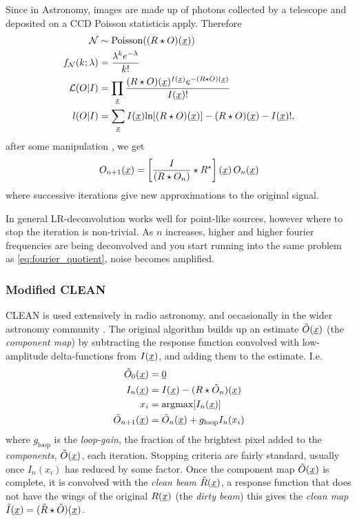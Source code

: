 Since in Astronomy, images are made up of photons collected by a telescope and deposited on a CCD Poisson statisticis apply. Therefore
\begin{align*}
	\mathcal{N} &\sim \textrm{Poisson}((R \star O)(\underline{x})) \\
	f_{\mathcal{N}}(k; \lambda) &= \frac{\lambda^{k} e^{-\lambda}}{k!} \\
	\mathcal{L}(O|I) &= \prod_{\underline{x}} \frac{(R \star O)(\underline{x})^{I(\underline{x})} e^{-(R \star O)(\underline{x})}} {I(\underline{x})!} \\
	l(O|I) &= \sum_{\underline{x}} I(\underline{x}) \textrm{ln}[(R \star O)(\underline{x})] -(R \star O)(\underline{x}) - I(\underline{x})!,
\end{align*}
after some manipulation \cite{LR_derivation}, we get
\begin{align}
	O_{n+1}(\underline{x}) = \left[\frac{I}{\left( R \star O_n \right)} \star R^\star \right](\underline{x}) \, O_n(\underline{x})
	\label{eq:lr_deconv}
\end{align}
where successive iterations give new approximations to the original signal. 

In general LR-deconvolution works well for point-like sources, however where to stop the iteration is non-trivial. As $n$ increases, higher and higher fourier frequencies are being deconvolved and you start running into the same problem as \eqref{eq:fourier_quotient}, noise becomes amplified.

\subsubsection{Modified CLEAN}

CLEAN \cite{hogbom74} is used extensively in radio astronomy, and occasionally in the wider astronomy community \cite{Keel91}. The original algorithm builds up an estimate $\tilde{O}(\underline{x})$ (the \emph{component map}) by subtracting the response function convolved with low-amplitude delta-functions from $I(\underline{x})$, and adding them to the estimate. I.e.
\begin{align}
	\tilde{O}_0(\underline{x}) &= \underline{0} \nonumber \\
	I_n(\underline{x}) &= I(\underline{x}) - (R \star \tilde{O}_n)(\underline{x}) \nonumber \\
	x_i &= \textrm{argmax}[I_n(\underline{x})] \nonumber \\
	\tilde{O}_{n+1}(\underline{x}) &= \tilde{O}_n(\underline{x}) + g_\textrm{loop} I_n(x_i)
	\label{eq:hogbom_clean}
\end{align}
where $g_\textrm{loop}$ is the \emph{loop-gain}, the fraction of the brightest pixel added to the \emph{components}, $\tilde{O}(\underline{x})$, each iteration. Stopping criteria are fairly standard, usually once $I_n(x_i)$ has reduced by some factor. Once the component map $\tilde{O}(\underline{x})$ is complete, it is convolved with the \emph{clean beam} $\tilde{R}(\underline{x})$, a response function that does not have the wings of the original $R(\underline{x})$ (the \emph{dirty beam}) this gives the \emph{clean map} $\tilde{I}(\underline{x}) = (\tilde{R} \star \tilde{O})(\underline{x})$.

